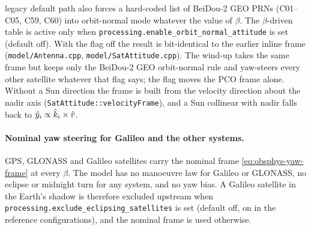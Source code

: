 \documentclass[main.tex]{subfiles}
\begin{document}
legacy default path also forces a hard-coded list of BeiDou-2 GEO
PRNs (C01--C05, C59, C60) into orbit-normal mode whatever the value of
$\beta$.  The $\beta$-driven table is active only when
\texttt{processing.enable\_orbit\_normal\_attitude} is set (default off).
With the flag off the result is bit-identical to the earlier inline frame
(\texttt{model/Antenna.cpp}, \texttt{model/SatAttitude.cpp}).  The
wind-up takes the same frame but keeps only the BeiDou-2 GEO
orbit-normal rule and yaw-steers every other satellite whatever that
flag says; the flag moves the PCO frame alone.  Without a Sun direction
the frame is built from the velocity direction about the nadir axis
(\texttt{SatAttitude::velocityFrame}), and a Sun collinear with nadir
falls back to $\hat{y}_i\propto\hat{k}_i\times\hat{v}$.

\paragraph{Nominal yaw steering for Galileo and the other systems.}
GPS, GLONASS and Galileo satellites carry the nominal frame
\eqref{eq:obsphys-yaw-frame} at every $\beta$.  The model has no
manoeuvre law for Galileo or GLONASS, no eclipse or midnight turn for any
system, and no yaw bias.  A Galileo satellite in the Earth's shadow is
therefore excluded upstream when
\texttt{processing.exclude\_eclipsing\_satellites} is set (default off,
on in the reference configurations), and the nominal frame is used
otherwise.
\end{document}
